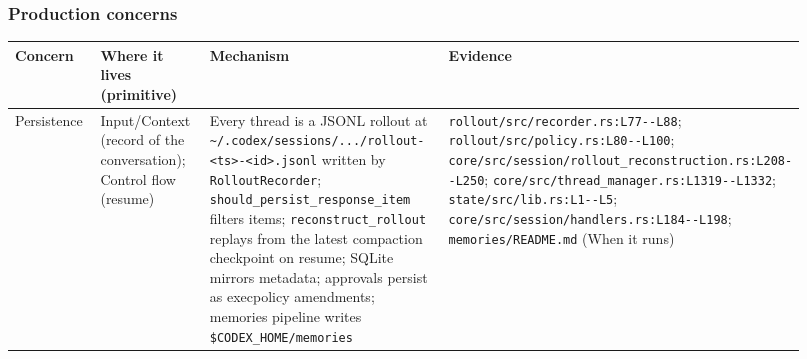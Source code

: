 \subsubsection*{Production concerns}
\begin{longtable}{@{}p{0.13\linewidth}p{0.17\linewidth}p{0.36\linewidth}p{0.26\linewidth}@{}}
\toprule \textbf{Concern} & \textbf{Where it lives (primitive)} & \textbf{Mechanism} & \textbf{Evidence} \\ \midrule \endhead
Persistence & Input/Context (record of the conversation); Control flow (resume) & Every thread is a JSONL rollout at \texttt{\textasciitilde{}/\allowbreak{}.\allowbreak{}codex/\allowbreak{}sessions/\allowbreak{}.\allowbreak{}.\allowbreak{}.\allowbreak{}/\allowbreak{}rollout-\allowbreak{}<ts>-\allowbreak{}<id>.\allowbreak{}jsonl} written by \texttt{RolloutRecorder}; \texttt{should\_\allowbreak{}persist\_\allowbreak{}response\_\allowbreak{}item} filters items; \texttt{reconstruct\_\allowbreak{}rollout} replays from the latest compaction checkpoint on resume; SQLite mirrors metadata; approvals persist as execpolicy amendments; memories pipeline writes \texttt{\$CODEX\_\allowbreak{}HOME/\allowbreak{}memories} & \texttt{rollout/\allowbreak{}src/\allowbreak{}recorder.\allowbreak{}rs:\allowbreak{}L77-\allowbreak{}-\allowbreak{}L88}; \texttt{rollout/\allowbreak{}src/\allowbreak{}policy.\allowbreak{}rs:\allowbreak{}L80-\allowbreak{}-\allowbreak{}L100}; \texttt{core/\allowbreak{}src/\allowbreak{}session/\allowbreak{}rollout\_\allowbreak{}reconstruction.\allowbreak{}rs:\allowbreak{}L208-\allowbreak{}-\allowbreak{}L250}; \texttt{core/\allowbreak{}src/\allowbreak{}thread\_\allowbreak{}manager.\allowbreak{}rs:\allowbreak{}L1319-\allowbreak{}-\allowbreak{}L1332}; \texttt{state/\allowbreak{}src/\allowbreak{}lib.\allowbreak{}rs:\allowbreak{}L1-\allowbreak{}-\allowbreak{}L5}; \texttt{core/\allowbreak{}src/\allowbreak{}session/\allowbreak{}handlers.\allowbreak{}rs:\allowbreak{}L184-\allowbreak{}-\allowbreak{}L198}; \texttt{memories/\allowbreak{}README.\allowbreak{}md} (When it runs) \\

\end{longtable}
